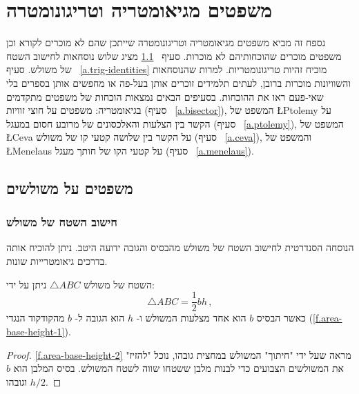 

\chapter{משפטים מגיאומטריה וטריגונומטרה}\label{a.trig}


נספח זה מביא משפטים מגיאומטריה וטריגונומטרה שייתכן שהם לא מוכרים לקורא וכן משפטים מוכרים שהוכחותיהם לא מוכרות. סעיף%
~\ref{a.triangles}
מציג שלוש נוסחאות לחישוב השטח של משולש. סעיף%
~\ref{a.trig-identities}
מוכיח זהיות טריגונומטריות. למרות שהנוסחאות והשוויונות מוכרות ברובן, לעתים תלמידים זוכרים אותן בעל-פה או מחפשים אותן בספרים בלי שאי-פעם ראו את ההוכחות. בסעיפים הבאים נמצאות הוכחות של משפטים מתקדמים בגיאומטריה: משפטים על חוצי זוויות (סעיף%
~\ref{a.bisector}),
המשפט של
\L{Ptolemy}
על הקשר בין הצלעות והאלכסונים של מרובע חסום במעגל (סעיף%
~\ref{a.ptolemy}),
המשפט של
\L{Ceva}
על הקשר בין שלושה קטעי קו של משולש (סעיף%
~\ref{a.ceva}),
והמשפט של
\L{Menelaus}
על קטעי הקו של חותך מעגל (סעיף%
~\ref{a.menelaus}).


\section{משפטים על משולשים}\label{a.triangles}


\subsection{חישוב השטח של משולש}

הנוסחה הסנדרטית לחישוב השטח של משולש מהבסיס והגובה ידועה היטב. ניתן להוכיח אותה בדרכים גיאומטרייות שונות.

\begin{theorem} 
השטח של משולש 
$\triangle ABC$
ניתן על ידי:
\begin{equation}\label{eq.area-from-base}
\triangle ABC=\frac{1}{2}bh\,,
\end{equation}
כאשר הבסיס 
$b$
הוא אחד מצלעות המשולש ו-%
$h$
הוא הגובה ל-%
$b$
מהקודקוד הנגדי
(\ref{f.area-base-height-1}).
\end{theorem}

\begin{proof}
\ref{f.area-base-height-2}
מראה שעל ידי "חיתוך" המשולש במחצית גובהו, נוכל "להזיז" את המשולשים הצבועים כדי לבנות מלבן ששטחו שווה לשטח המשולש. בסיס המלבן הוא 
$b$
וגובהו
$h/2$.
\end{proof}

